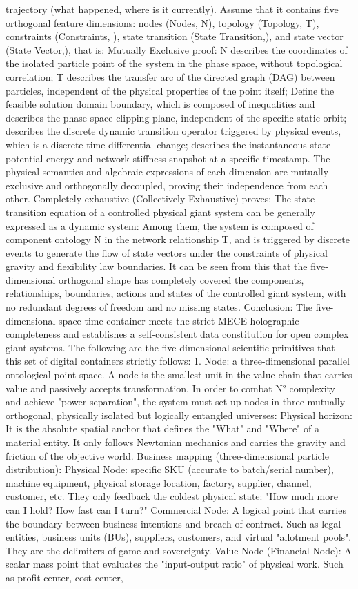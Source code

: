 \documentclass[11pt,a4paper]{article}
\begin{document}
trajectory (what happened, where is it currently). Assume that it contains five orthogonal feature dimensions: nodes (Nodes, N), topology (Topology, T), constraints (Constraints, ), state transition (State Transition,), and state vector (State Vector,), that is: Mutually Exclusive proof: N describes the coordinates of the isolated particle point of the system in the phase space, without topological correlation; T describes the transfer arc of the directed graph (DAG) between particles, independent of the physical properties of the point itself; Define the feasible solution domain boundary, which is composed of inequalities and describes the phase space clipping plane, independent of the specific static orbit; describes the discrete dynamic transition operator triggered by physical events, which is a discrete time differential change; describes the instantaneous state potential energy and network stiffness snapshot at a specific timestamp. The physical semantics and algebraic expressions of each dimension are mutually exclusive and orthogonally decoupled, proving their independence from each other. Completely exhaustive (Collectively Exhaustive) proves: The state transition equation of a controlled physical giant system can be generally expressed as a dynamic system: Among them, the system is composed of component ontology N in the network relationship T, and is triggered by discrete events to generate the flow of state vectors under the constraints of physical gravity and flexibility law boundaries. It can be seen from this that the five-dimensional orthogonal shape has completely covered the components, relationships, boundaries, actions and states of the controlled giant system, with no redundant degrees of freedom and no missing states. Conclusion: The five-dimensional space-time container meets the strict MECE holographic completeness and establishes a self-consistent data constitution for open complex giant systems. The following are the five-dimensional scientific primitives that this set of digital containers strictly follows: 1. Node: a three-dimensional parallel ontological point space. A node is the smallest unit in the value chain that carries value and passively accepts transformation. In order to combat N² complexity and achieve "power separation", the system must set up nodes in three mutually orthogonal, physically isolated but logically entangled universes: Physical horizon: It is the absolute spatial anchor that defines the "What" and "Where" of a material entity. It only follows Newtonian mechanics and carries the gravity and friction of the objective world. Business mapping (three-dimensional particle distribution): Physical Node: specific SKU (accurate to batch/serial number), machine equipment, physical storage location, factory, supplier, channel, customer, etc. They only feedback the coldest physical state: "How much more can I hold? How fast can I turn?" Commercial Node: A logical point that carries the boundary between business intentions and breach of contract. Such as legal entities, business units (BUs), suppliers, customers, and virtual "allotment pools". They are the delimiters of game and sovereignty. Value Node (Financial Node): A scalar mass point that evaluates the "input-output ratio" of physical work. Such as profit center, cost center, 
\end{document}
